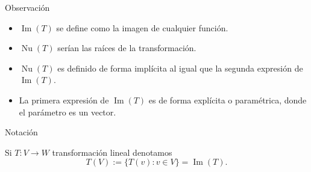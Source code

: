 \documentclass{beamer} %
\newcommand{\img}{\operatorname{Im}}
\newcommand{\im}{\operatorname{Im}}
\renewcommand\nu{\operatorname{Nu}}
\begin{document}
\begin{frame}

\begin{block}{Observación}
\begin{itemize}\pause
\item $\img(T)$ se define como la imagen de cualquier función. \pause

\item $\nu(T)$ serían las raíces de la transformación. \pause

\item $\nu(T)$ es definido de forma implícita al igual que la segunda expresión de $\img(T)$. \pause

\item La primera expresión de $\img(T)$ es de forma explícita o paramétrica, donde el parámetro es un vector.

\end{itemize}

\begin{block}{Notación}

    Si $T : V \to W$ transformación lineal denotamos
$$
          T(V) := \{T(v): v \in V \} = \im(T).
$$
    
\end{block}
 
\end{block}

\end{frame}

\end{document}
